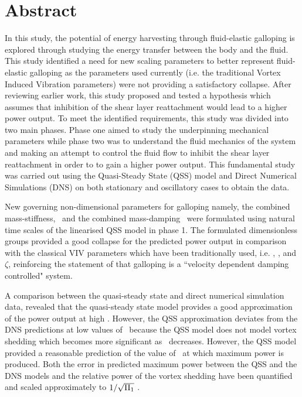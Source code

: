 \chapter*{Abstract}

In this study, the potential of energy harvesting through fluid-elastic galloping is explored through studying the energy transfer between the body and the fluid. This study identified a need for new scaling parameters to better represent fluid-elastic galloping as the parameters used currently (i.e. the traditional Vortex Induced Vibration parameters) were not providing a satisfactory collapse. After reviewing earlier work, this study proposed and tested a hypothesis which assumes that inhibition of the shear layer reattachment would lead to a higher power output. To meet the identified requirements, this study was divided into two main phases. Phase one aimed to study the underpinning mechanical parameters while phase two was to understand the fluid mechanics of the system and making an attempt to control the fluid flow to inhibit the shear layer reattachment in order to to gain a higher power output. This fundamental study  was carried out using the Quasi-Steady State (QSS) model and Direct Numerical Simulations (DNS) on both stationary and oscillatory cases to obtain the data.

New governing non-dimensional parameters for galloping namely, the combined mass-stiffness, \massstiff\, and the combined mass-damping \massdamp\ were formulated using natural time scales of the linearised QSS model in phase 1. The formulated dimensionless groups provided a good collapse for the predicted power output in comparison with the classical VIV parameters which have been traditionally used, i.e. \ustar, \mstar, and $\zeta$, reinforcing the statement of \citet{Paidoussis2010} that galloping is a ``velocity dependent damping controlled" system.  

A comparison between the quasi-steady state and direct numerical simulation data, revealed that the quasi-steady state model provides a good approximation of the power output at high \massstiff. However, the QSS approximation deviates from the DNS predictions at low values of \massstiff\ because the QSS model does not model vortex shedding which becomes more significant as \massstiff\ decreases. However, the QSS model provided a reasonable prediction of the value of \massdamp\ at which maximum power is produced. Both the error in predicted maximum power between the QSS and the DNS models and the relative power of the vortex shedding have been quantified and scaled approximately to $1/\sqrt{\Pi_1}$ .
 
